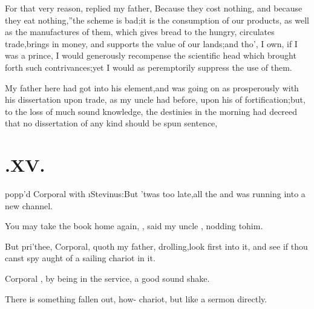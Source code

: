 \documentclass[twoside]{article}
\begin{document}
For that very reason, replied my father,
\lqq Because they cost nothing, and\break
\lqq because they eat nothing,”\tsk the scheme\break
is bad;\tsk it is the
consumption of our products, as well as the manufactures of them,
which gives bread to the hungry, circulates trade,\tsk brings in
money, and supports the value of our lands;\tsk and tho’, I
own, if I was a prince, I would
ge\-nerously recompense the scientific head which brought
forth such contrivances;\break\tsk yet I
would as peremptorily suppress the use of them.

My father here had got into his element,\tsh and was going on
as pros\-per\-ously with his dissertation upon trade, as my uncle
\toby had before, upon his\break 
of fortification;\tsh but, to the loss\break
of much sound knowledge, the destinies in the morning had
decreed that no
dissertation of any kind should be spun
\break sentence,

\section{\chapstrut{}.\enspace  XV.}

 popp’d Corporal \trim with
\i{Stevinus:}\tsk But ’twas too late,\tsk all the\break
{}
and was running into a new channel.

\tsk You may take the book home again, \trim, said my
uncle \toby, nodding to\break him.

But pri’thee, Corporal, quoth my father, drolling,\tsk look
first into it, and see if thou canst spy aught of a
sailing\break
chariot in it.

Corporal \trim, by being in the service,\break
{}
a good sound shake.

There is something fallen out, how-
chariot, but like a sermon directly.
\end{document}
